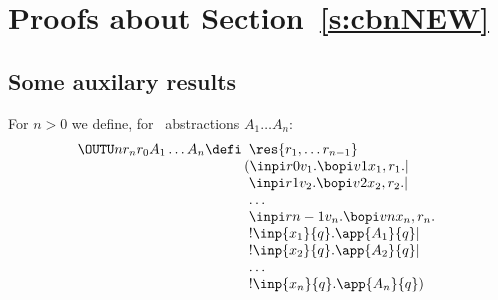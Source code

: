\section{Proofs about Section~\ref{s:cbnNEW}}
\label{a:cbn}
             
\subsection{Some auxilary results}



             

For $n>0$ we  define, for \piI\ abstractions  $A_1 \ldots A_n$:
\[\begin{array}{l}
\OUTU n {r_n}{r_0} {A_1 \ldots A_n}{} \defi 
\begin{array}[t]{l}
\res{r_1, \ldots r_{n-1}} \\
\! \! (\inpi r 0 {v_1} . \bopi v 1{x_{1},r_{1}}.    
 | \\
\inpi r 1 {v_2} . \bopi v 2{x_{2},r_{2}}    .  
 | \\
\ldots  \\
\inpi r {n-1} {v_n} . \bopi v n{x_{n},r_{n}}    .  
 \\
  !  \inp {x_1} {q} . {\app{A_1}{q} } | \\
  !  \inp {x_2} {q} . {\app{A_2}{q} } | \\
\ldots  \\
  !  \inp {x_n} {q} . {\app{A_n}{q} } )
  \end{array} 
  \end{array} 
\]



